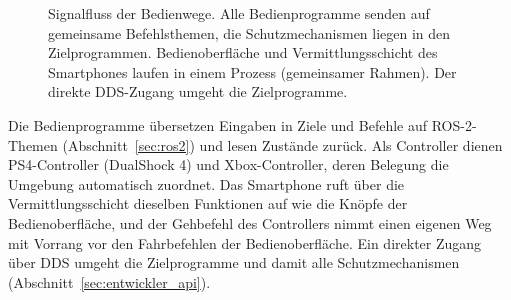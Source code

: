 \begin{figure}[htbp]
  \centering
  
  \caption[Signalfluss der Bedienwege]{Signalfluss der Bedienwege. Alle Bedienprogramme senden auf gemeinsame Befehlsthemen, die Schutzmechanismen liegen in den Zielprogrammen. Bedienoberfläche und Vermittlungsschicht des Smartphones laufen in einem Prozess (gemeinsamer Rahmen). Der direkte \acs{DDS}-Zugang umgeht die Zielprogramme.}
  \label{fig:bedienwege_signal}
\end{figure}

Die Bedienprogramme übersetzen Eingaben in Ziele und Befehle auf ROS-2-Themen (Abschnitt~\ref{sec:ros2}) und lesen Zustände zurück.
Als Controller dienen PS4-Controller (DualShock 4) und Xbox-Controller, deren Belegung die Umgebung automatisch zuordnet.
Das Smartphone ruft über die Vermittlungsschicht dieselben Funktionen auf wie die Knöpfe der Bedienoberfläche, und der Gehbefehl des Controllers nimmt einen eigenen Weg mit Vorrang vor den Fahrbefehlen der Bedienoberfläche.
Ein direkter Zugang über \ac{DDS} umgeht die Zielprogramme und damit alle Schutzmechanismen (Abschnitt~\ref{sec:entwickler_api}).

